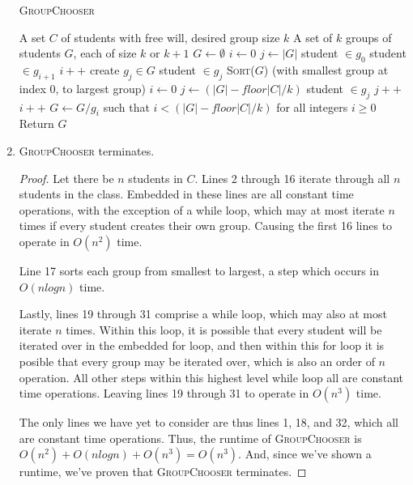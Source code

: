 \documentclass{article}
\begin{document}
\begin{enumerate}
		\begin{algorithm}
			\caption{\textsc{GroupChooser}}
			\begin{algorithmic}[1]
				\Require A set $C$ of students with free will, desired group size $k$
				\Ensure A set of $k$ groups of students $G$, each of size $k$ or $k+1$
				\State $G \gets \emptyset$
					\State $i \gets 0$
					\State $j \gets |G|$
						\State student $\in g_0$
					\EndIf
							\State student $\in g_{i+1}$
						\EndIf
						\State $i++$
					\EndWhile
					\State create $g_j \in G$
					\State student $\in g_j$
				\EndFor
				\State \textsc{Sort($G$)} (with smallest group at index 0, to largest group)
				\State $i \gets 0$
						\State $j \gets (|G|-floor|C|/k)$
								\State student $\in g_j$
								\State $j++$
							\EndIf
						\EndFor
						\State $i++$
					\EndFor
					\State $G \gets G/g_i$ such that $i < (|G| - floor|C|/k)$ for all integers $i \geq 0$
				\EndWhile
				\State Return $G$
			\end{algorithmic}
		\end{algorithm}

	\item \textsc{GroupChooser} terminates.
		\begin{proof}
			Let there be $n$ students in $C$.
			Lines 2 through 16 iterate through all $n$ students in the class. Embedded in these lines
			are all constant time operations, with the exception of a while loop, which may at most
			iterate $n$ times if every student creates their own group. Causing the first 16 lines to
			operate in $O(n^2)$ time.

			Line 17 sorts each group from smallest to largest, a step which occurs in $O(nlogn)$ time.

			Lastly, lines 19 through 31 comprise a  while loop, which may also at most iterate $n$ times.
			Within this loop, it is possible that every student will be iterated over in the embedded
			for loop, and then within this for loop it is posible that every group may be iterated
			over, which is also an order of $n$ operation. All other steps within this highest level
			while loop all are constant time operations. Leaving lines 19 through 31 to operate in
			$O(n^3)$ time.

			The only lines we have yet to consider are thus lines 1, 18, and 32, which all are
			constant time operations. Thus, the runtime of \textsc{GroupChooser} is
			$O(n^2) + O(nlogn) + O(n^3) = O(n^3)$. And, since we've shown a runtime, we've proven
			that \textsc{GroupChooser} terminates.
		\end{proof}
\end{enumerate}
\end{document}
